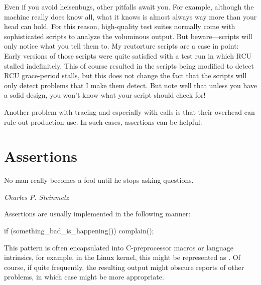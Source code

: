 Even if you avoid heisenbugs, other pitfalls await you.
For example, although the machine really does know all,
what it knows is almost always way more than your head can hold.
For this reason, high-quality test suites normally come with sophisticated
scripts to analyze the voluminous output.
But beware---scripts will only notice what you tell them to.
My rcutorture scripts are a case in point: Early versions of those
scripts were quite satisfied with a test run in which RCU 
stalled indefinitely.
This of course resulted in the scripts being modified to detect RCU
grace-period stalls, but this does not change the fact that the scripts
will only detect problems that I make them detect.
But note well that unless you have a solid design, you won't know what
your script should check for!

Another problem with tracing and especially with  calls
is that their overhead can rule out production use.
In such cases, assertions can be helpful.

\section{Assertions}
\label{sec:debugging:Assertions}
%
\epigraph{No man really becomes a fool until he stops asking questions.}
	 {\emph{Charles P. Steinmetz}}

Assertions are usually implemented in the following manner:

\begin{VerbatimN}
if (something_bad_is_happening())
	complain();
\end{VerbatimN}

This pattern is often encapsulated into C-preprocessor macros or
language intrinsics, for example, in the Linux kernel, this might
be represented as .
Of course, if  quite frequently,
the resulting output might obscure reports of other problems,
in which case
 might be more appropriate.

\QuickQuizEnd

